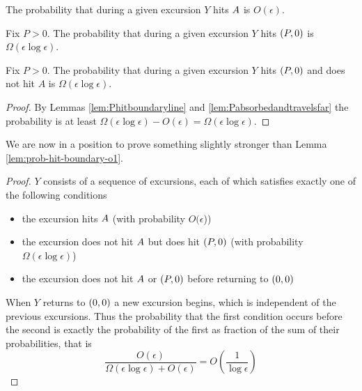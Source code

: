 {\newcommand{\Omegaeloge}{\Omega(\epsilon\log\epsilon)}

\newcommand{\probexcursion}[2]{The probability that during a given
  excursion #1 is #2.}

\begin{lemma}
  \label{lem:Phitboundaryline}
  \probexcursion{$Y$ hits $A$}{$O(\epsilon)$}
\end{lemma}

\begin{lemma}
  \label{lem:Pabsorbedandtravelsfar}
  Fix $P > 0$. \probexcursion{$Y$ hits $(P,0)$}{$\Omegaeloge$}
\end{lemma}

\begin{lemma*}
  Fix $P > 0$.  \probexcursion{$Y$ hits $(P,0)$ and does not hit
    $A$}{$\Omegaeloge$}
\end{lemma*}

\begin{proof}
  By Lemmas \ref{lem:Phitboundaryline} and
  \ref{lem:Pabsorbedandtravelsfar} the probability is at least
  $\Omegaeloge - O(\epsilon) = \Omegaeloge$.
\end{proof}

We are now in a position to prove something slightly stronger than
Lemma \ref{lem:prob-hit-boundary-o1}.

\begin{lemma*}
\end{lemma*}

\newcommand{\Oe}{O(\epsilon)}

\begin{proof}
  $Y$ consists of a sequence of excursions, each of which satisfies
  exactly one of the following conditions
  \begin{itemize}
  \item the excursion hits $A$ (with probability
    $O(\epsilon$))
  \item the excursion does not hit $A$ but does hit
    $(P,0)$ (with probability $\Omegaeloge$)
  \item the excursion does not hit $A$ or $(P,0)$ before
    returning to $(0,0)$
  \end{itemize}
  When $Y$ returns to $(0,0)$ a new excursion begins, which is independent of
  the previous excursions.  Thus the probability that the first
  condition occurs before the second is exactly the probability of the
  first as fraction of the sum of their probabilities, that is
  \[
  \frac{\Oe}{\Omegaeloge + \Oe} = O\left(\frac{1}{\log\epsilon}\right)
  \]
\end{proof}

}
